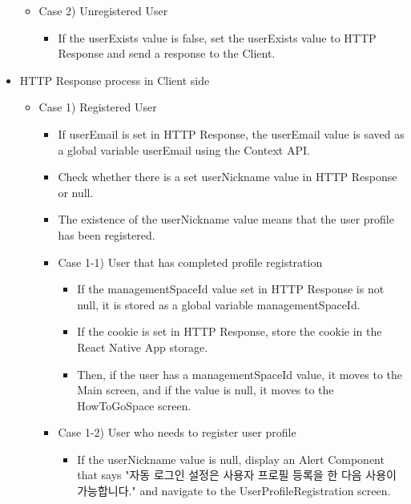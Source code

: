 \documentclass[conference]{IEEEtran}
\begin{document}
\begin{itemize}
\begin{itemize}
\begin{itemize}
        \end{itemize}
    \end{itemize}
    \begin{itemize}
        \item Case 2) Unregistered User
        \begin{itemize}
            \item If the userExists value is false, set the userExists value to HTTP Response and send a response to the Client.
            \\
        \end{itemize}
    \end{itemize}
    \item HTTP Response process in Client side
    \begin{itemize}
        \item Case 1) Registered User
        \begin{itemize}
            \item If userEmail is set in HTTP Response, the userEmail value is saved as a global variable userEmail using the Context API.
            \item Check whether there is a set userNickname value in HTTP Response or null.
            \item The existence of the userNickname value means that the user profile has been registered.
            \item Case 1-1) User that has completed profile registration
            \begin{itemize}
                \item If the managementSpaceId value set in HTTP Response is not null, it is stored as a global variable managementSpaceId.
                \item If the cookie is set in HTTP Response, store the cookie in the React Native App storage.
                \item Then, if the user has a managementSpaceId value, it moves to the Main screen, and if the value is null, it moves to the HowToGoSpace screen.
            \end{itemize}
            \item Case 1-2) User who needs to register user profile
            \begin{itemize}
                \item If the userNickname value is null, display an Alert Component that says "자동 로그인 설정은 사용자 프로필 등록을 한 다음 사용이 가능합니다." and navigate to the UserProfileRegistration screen.

\end{itemize}
\end{itemize}
\end{itemize}
\end{itemize}
\end{document}
